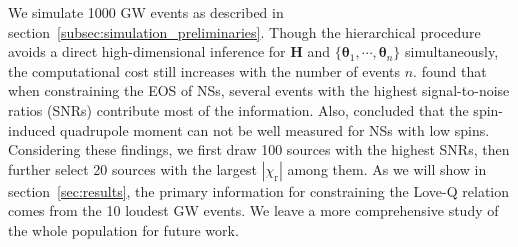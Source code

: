 \documentclass[a4paper,11pt]{article}
\begin{document}
We simulate 1000 GW events as 
described in section~\ref{subsec:simulation_preliminaries}. 
Though the hierarchical procedure avoids a direct high-dimensional inference for
$\bm{H}$ and $\{\bm{\theta}_1,\cdots,\bm{\theta}_n\}$ simultaneously, the
computational cost still increases with the number of events $n$.
\citet{Lackey:2014fwa} found that when constraining the EOS of NSs, several events
with the highest signal-to-noise ratios (SNRs)
 contribute most of the information. Also,
\citet{Yagi:2013awa} concluded that the spin-induced quadrupole moment can not
be well measured for NSs with low spins. Considering these findings, we first
draw 100 sources with the highest SNRs, then further select 20 sources with the
largest $|\chi_{\mathrm{r}}|$ among them. As we will show in section~\ref{sec:results}, the primary
information for constraining the Love-Q relation comes from the 10 loudest GW
events. We leave a more comprehensive study of the whole population for future
work. 
\end{document}
